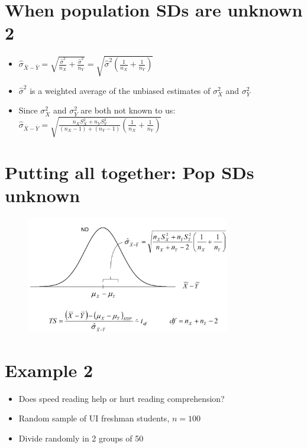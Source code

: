 \documentclass[12pt]{article}
\begin{document}
\section{When population SDs are unknown
2}\label{when-population-sds-are-unknown-2}

\begin{itemize}
\itemsep1pt\parskip0pt
\item
  \(\hat{\sigma}_{\bar{X} - \bar{Y}} = \sqrt{\frac{\hat{\sigma}^{2}}{n_{X}} + \frac{\hat{\sigma}^{2}}{n_{Y}}} = \sqrt{\hat{\sigma}^2\left(\frac{1}{n_{X}} + \frac{1}{n_{Y}}\right)}\)
\item
  \(\hat{\sigma}^2\) is a weighted average of the unbiased estimates of
  \(\sigma^2_{X}\) and \(\sigma^2_{Y}\)
\item
  Since \(\sigma^2_{X}\) and \(\sigma^2_{Y}\) are both not known to us:
  \(\hat{\sigma}_{\bar{X} - \bar{Y}} = \sqrt{\frac{n_{X}S^2_{X} + n_{Y}S^2_{Y}}{(n_{X} - 1) + (n_{Y} - 1)} \left(\frac{1}{n_{X}} + \frac{1}{n_{Y}}\right)}\)
\end{itemize}

\section{Putting all together: Pop SDs
unknown}\label{putting-all-together-pop-sds-unknown}

\begin{figure}[H]
\centering
\includegraphics[width=3.5in]{samp_dist_2samp_tdist.png}
\caption{}
\end{figure}

\section{Example 2}\label{example-2}

\begin{itemize}
\itemsep1pt\parskip0pt
\item
  Does speed reading help or hurt reading comprehension?
\item
  Random sample of UI freshman students, \(n = 100\)
\item
  Divide randomly in 2 groups of 50
\end{itemize}
\end{document}
